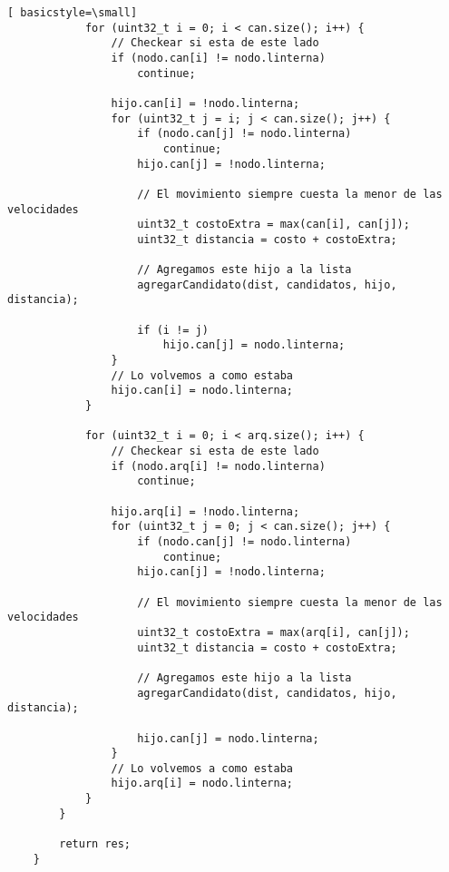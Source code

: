 \begin{lstlisting}[ basicstyle=\small]
            for (uint32_t i = 0; i < can.size(); i++) {
                // Checkear si esta de este lado
                if (nodo.can[i] != nodo.linterna)
                    continue;

                hijo.can[i] = !nodo.linterna;
                for (uint32_t j = i; j < can.size(); j++) {
                    if (nodo.can[j] != nodo.linterna)
                        continue;
                    hijo.can[j] = !nodo.linterna;

                    // El movimiento siempre cuesta la menor de las velocidades
                    uint32_t costoExtra = max(can[i], can[j]);
                    uint32_t distancia = costo + costoExtra;

                    // Agregamos este hijo a la lista
                    agregarCandidato(dist, candidatos, hijo, distancia);

                    if (i != j)
                        hijo.can[j] = nodo.linterna;
                }
                // Lo volvemos a como estaba
                hijo.can[i] = nodo.linterna;
            }

            for (uint32_t i = 0; i < arq.size(); i++) {
                // Checkear si esta de este lado
                if (nodo.arq[i] != nodo.linterna)
                    continue;

                hijo.arq[i] = !nodo.linterna;
                for (uint32_t j = 0; j < can.size(); j++) {
                    if (nodo.can[j] != nodo.linterna)
                        continue;
                    hijo.can[j] = !nodo.linterna;

                    // El movimiento siempre cuesta la menor de las velocidades
                    uint32_t costoExtra = max(arq[i], can[j]);
                    uint32_t distancia = costo + costoExtra;

                    // Agregamos este hijo a la lista
                    agregarCandidato(dist, candidatos, hijo, distancia);

                    hijo.can[j] = nodo.linterna;
                }
                // Lo volvemos a como estaba
                hijo.arq[i] = nodo.linterna;
            }
        }

        return res;
    }
\end{lstlisting}
